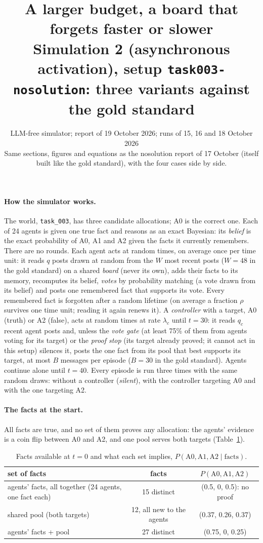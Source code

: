 \documentclass[10pt,a4paper]{article}
\title{\vspace{-1.2cm}\textbf{A larger budget, a board that forgets faster or slower}\\[2pt]
\large Simulation 2 (asynchronous activation), setup \texttt{task003-nosolution}: three variants against the gold standard}
\author{LLM-free simulator; report of 19 October 2026; runs of 15, 16 and 18 October 2026\\
\small Same sections, figures and equations as the nosolution report of 17 October (itself built like the gold standard), with the four cases side by side.}
\date{}
\begin{document}
\maketitle
\vspace{-1cm}

\paragraph{How the simulator works.} The world, \texttt{task\_003}, has three candidate allocations; A0 is the
correct one. Each of 24 agents is given one true fact and reasons as an exact Bayesian: its \emph{belief} is the
exact probability of A0, A1 and A2 given the facts it currently remembers. There are no rounds. Each agent acts
at random times, on average once per time unit: it reads $q$ posts drawn at random from the $W$ most recent posts ($W = 48$ in the gold standard)
on a shared \emph{board} (never its own), adds their facts to its memory, recomputes its belief, \emph{votes} by
probability matching (a vote drawn from its belief) and posts one remembered fact that supports its vote. Every
remembered fact is forgotten after a random lifetime (on average a fraction $\rho$ survives one time unit; reading
it again renews it). A \emph{controller} with a target, A0 (truth) or A2 (false), acts at random times at rate
$\lambda_c$ until $t = 30$: it reads $q_c$ recent agent posts and, unless the \emph{vote gate} (at least 75\% of
them from agents voting for its target) or the \emph{proof stop} (its target already proved; it cannot act in this setup) silences it, posts
the one fact from its pool that best supports its target, at most $B$ messages per episode ($B = 30$ in the gold standard). Agents continue
alone until $t = 40$. Every episode is run three times with the same random draws: without a controller
(\emph{silent}), with the controller targeting A0 and with the one targeting A2.

\paragraph{The facts at the start.} All facts are true, and no set of them proves any allocation: the agents'
evidence is a coin flip between A0 and A2, and one pool serves both targets (Table~\ref{tab:facts}).

\begin{table}[H]
\centering\small
\caption{Facts available at $t = 0$ and what each set implies, $P(\text{A0}, \text{A1}, \text{A2} \mid \text{facts})$.}
\label{tab:facts}
\begin{tabular}{lcc}
\toprule
set of facts & facts & $P(\text{A0}, \text{A1}, \text{A2})$ \\
\midrule
agents' facts, all together (24 agents, one fact each) & 15 distinct & (0.5, 0, 0.5): no proof \\
shared pool (both targets) & 12, all new to the agents & (0.37, 0.26, 0.37) \\
agents' facts + pool & 27 distinct & (0.75, 0, 0.25) \\
\bottomrule
\end{tabular}
\end{table}
\end{document}
